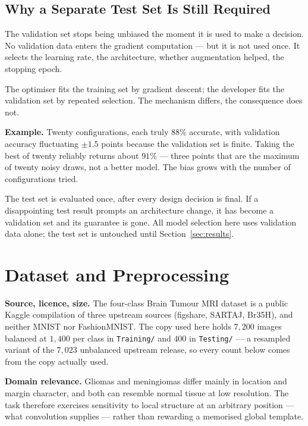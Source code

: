 \documentclass[10pt,a4paper]{article}
\begin{document}
\subsection{Why a Separate Test Set Is Still Required}
\label{sec:testset}

The validation set stops being unbiased the moment it is used to make a
decision. No validation data enters the gradient computation --- but it is not
used once. It selects the learning rate, the architecture, whether augmentation
helped, the stopping epoch.

The optimiser fits the training set by gradient descent; the developer fits the
validation set by repeated selection. The mechanism differs, the consequence
does not.

\textbf{Example.} Twenty configurations, each truly $88\%$ accurate, with
validation accuracy fluctuating $\pm1.5$ points because the validation set is
finite. Taking the best of twenty reliably returns about $91\%$ --- three
points that are the maximum of twenty noisy draws, not a better model. The bias
grows with the number of configurations tried.

The test set is evaluated once, after every design decision is final. If a
disappointing test result prompts an architecture change, it has become a
validation set and its guarantee is gone. All model selection here uses
validation data alone; the test set is untouched until
Section~\ref{sec:results}.

\section{Dataset and Preprocessing}
\label{sec:data}

\textbf{Source, licence, size.} The four-class Brain Tumour MRI dataset
\cite{dataset} is a public Kaggle compilation of three upstream sources
(figshare, SARTAJ, Br35H), and neither MNIST nor FashionMNIST. The copy used
here holds $7{,}200$ images balanced at $1{,}400$ per class in
\texttt{Training/} and $400$ in \texttt{Testing/} --- a resampled variant of the
$7{,}023$ unbalanced upstream release, so every count below comes from the copy
actually used.

\textbf{Domain relevance.} Gliomas and meningiomas differ mainly in location and
margin character, and both can resemble normal tissue at low resolution. The
task therefore exercises sensitivity to local structure at an arbitrary
position --- what convolution supplies --- rather than rewarding a memorised
global template.
\end{document}
